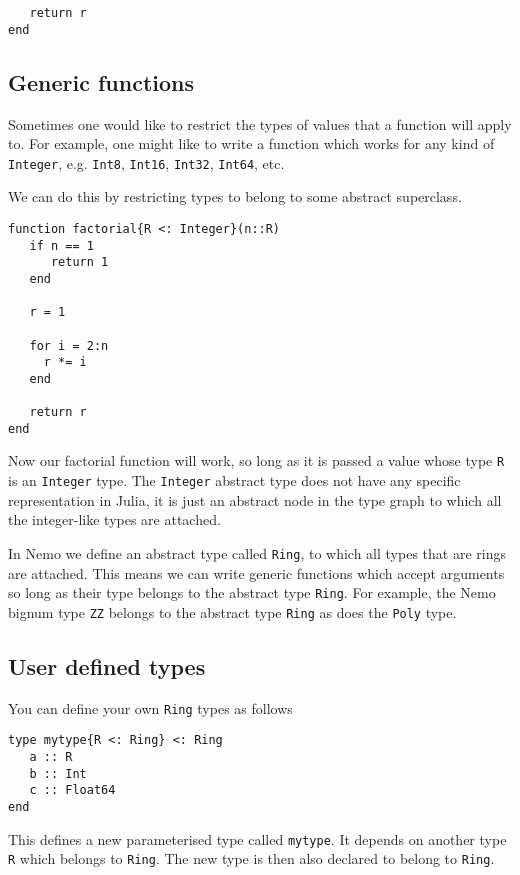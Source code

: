 \documentclass[a4paper,10pt]{article}
\newcommand{\code}{\lstinline}
\begin{document}
{\begin{lstlisting}
   return r  
end
\end{lstlisting}

\subsection{Generic functions}

Sometimes one would like to restrict the types of values that a function will apply to. For
example, one might like to write a function which works for any kind of \code{Integer}, e.g.
\code{Int8}, \code{Int16}, \code{Int32}, \code{Int64}, etc.

We can do this by  restricting types to belong to some abstract superclass.

\begin{lstlisting}
function factorial{R <: Integer}(n::R)
   if n == 1
      return 1
   end

   r = 1
   
   for i = 2:n
     r *= i
   end

   return r  
end
\end{lstlisting}

Now our factorial function will work, so long as it is passed a value whose type \code{R} is
an \code{Integer} type. The \code{Integer} abstract type does not have any specific
representation in Julia, it is just an abstract node in the type graph to which all the
integer-like types are attached.

In Nemo we define an abstract type called \code{Ring}, to which all types that are rings
are attached. This means we can write generic functions which accept arguments so long as
their type belongs to the abstract type \code{Ring}. For example, the Nemo bignum type
\code{ZZ} belongs to the abstract type \code{Ring} as does the \code{Poly} type.

\subsection{User defined types}

You can define your own \code{Ring} types as follows

\begin{lstlisting}
type mytype{R <: Ring} <: Ring
   a :: R
   b :: Int
   c :: Float64
end
\end{lstlisting}

This defines a new parameterised type called \code{mytype}. It depends on another type
\code{R} which belongs to \code{Ring}. The new type is then also declared to belong to
\code{Ring}.

}
\end{document}
